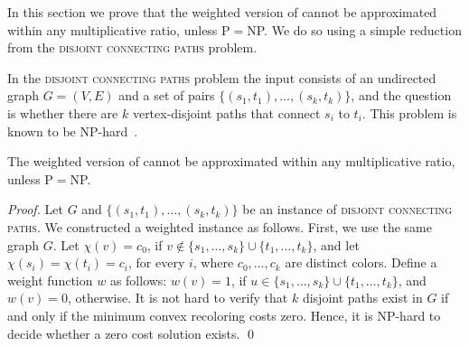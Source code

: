 \label{sec:hard}


In this section we prove that the weighted version of \TWOCR{} cannot
 be approximated within any multiplicative ratio, unless P$=$NP.  We
 do so using a simple reduction from the \textsc{disjoint connecting
 paths} problem.

In the \textsc{disjoint connecting paths} problem the input consists
of an undirected graph $G=(V,E)$ and a set of pairs $\{(s_1,
t_1), \ldots, (s_k, t_k)\}$, and the question is whether there are $k$
vertex-disjoint paths that connect $s_i$ to $t_i$.  This problem is
known to be NP-hard~\cite{karp1972reducibility}.

\begin{theorem}
The weighted version of \TWOCR{} cannot be approximated within any
 multiplicative ratio, unless P$=$NP.
\end{theorem}
\begin{proof}
Let $G$ and $\{(s_1, t_1), \ldots, (s_k, t_k)\}$ be an instance
of \textsc{disjoint connecting paths}.  We constructed a
weighted \TWOCR{} instance as follows.  First, we use the same graph
$G$.  Let $\chi(v) = c_0$, if
$v \not\in \{s_1,\ldots,s_k\} \cup \{t_1,\ldots,t_k\}$, and let
$\chi(s_i) = \chi(t_i) = c_i$, for every $i$, where $c_0, \ldots, c_k$
are distinct colors.
%
Define a weight function $w$ as follows: $w(v) = 1$, if
$u \in \{s_1,\ldots,s_k\} \cup \{t_1,\ldots,t_k\}$, and $w(v) = 0$,
otherwise.
%
It is not hard to verify that $k$ disjoint paths exist in $G$ if and
only if the minimum convex recoloring costs zero.  Hence, it is
NP-hard to decide whether a zero cost solution exists.
\qed
\end{proof}
